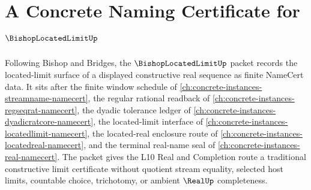 \chapter{A Concrete Naming Certificate for $\BishopLocatedLimitUp$}
\label{ch:concrete-instances-bishop-located-limit-namecert}

Following Bishop and Bridges, the $\BishopLocatedLimitUp$ packet records the located-limit surface of a displayed constructive real sequence as finite NameCert data. It sits after the finite window schedule of \autoref{ch:concrete-instances-streamname-namecert}, the regular rational readback of \autoref{ch:concrete-instances-regseqrat-namecert}, the dyadic tolerance ledger of \autoref{ch:concrete-instances-dyadicratcore-namecert}, the located-limit interface of \autoref{ch:concrete-instances-locatedlimit-namecert}, the located-real enclosure route of \autoref{ch:concrete-instances-locatedreal-namecert}, and the terminal real-name seal of \autoref{ch:concrete-instances-real-namecert}. The packet gives the L10 Real and Completion route a traditional constructive limit certificate without quotient stream equality, selected host limits, countable choice, trichotomy, or ambient $\RealUp$ completeness.

